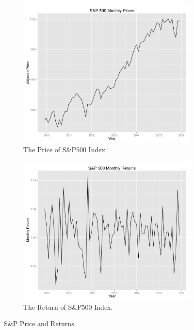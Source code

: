 \documentclass[10pt]{article_simple}
\begin{document}
\begin{figure}[H]
\centering
	\begin{subfigure}{.45\textwidth}
  	\centering
  	\includegraphics[width=.95\linewidth]{SP500_Price}
  	\caption{The Price of S\&P500 Index}
	\end{subfigure}%
	\hspace{1em}
	\begin{subfigure}{.45\textwidth}
  	\centering
  	\includegraphics[width=.95\linewidth]{SP500_Return}
  	\caption{The Return of S\&P500 Index.}
	\end{subfigure}
	\caption{S\&P Price and Returns.}
\end{figure}
\end{document}
